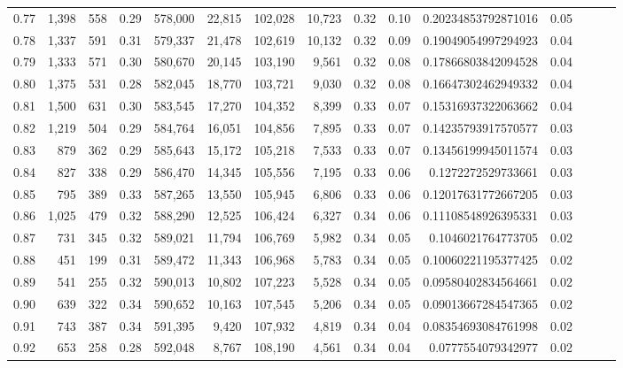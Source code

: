 \begin{tabular}{rrrrrrrrrrrrrrr}
0.77 &   1,398 &    558 &  0.29 &  578,000 &   22,815 &  102,028 &   10,723 &  0.32 &  0.10 &   0.20234853792871016 &      0.05 \\
0.78 &   1,337 &    591 &  0.31 &  579,337 &   21,478 &  102,619 &   10,132 &  0.32 &  0.09 &   0.19049054997294923 &      0.04 \\
0.79 &   1,333 &    571 &  0.30 &  580,670 &   20,145 &  103,190 &    9,561 &  0.32 &  0.08 &   0.17866803842094528 &      0.04 \\
0.80 &   1,375 &    531 &  0.28 &  582,045 &   18,770 &  103,721 &    9,030 &  0.32 &  0.08 &   0.16647302462949332 &      0.04 \\
0.81 &   1,500 &    631 &  0.30 &  583,545 &   17,270 &  104,352 &    8,399 &  0.33 &  0.07 &   0.15316937322063662 &      0.04 \\
0.82 &   1,219 &    504 &  0.29 &  584,764 &   16,051 &  104,856 &    7,895 &  0.33 &  0.07 &   0.14235793917570577 &      0.03 \\
0.83 &     879 &    362 &  0.29 &  585,643 &   15,172 &  105,218 &    7,533 &  0.33 &  0.07 &   0.13456199945011574 &      0.03 \\
0.84 &     827 &    338 &  0.29 &  586,470 &   14,345 &  105,556 &    7,195 &  0.33 &  0.06 &    0.1272272529733661 &      0.03 \\
0.85 &     795 &    389 &  0.33 &  587,265 &   13,550 &  105,945 &    6,806 &  0.33 &  0.06 &   0.12017631772667205 &      0.03 \\
0.86 &   1,025 &    479 &  0.32 &  588,290 &   12,525 &  106,424 &    6,327 &  0.34 &  0.06 &   0.11108548926395331 &      0.03 \\
0.87 &     731 &    345 &  0.32 &  589,021 &   11,794 &  106,769 &    5,982 &  0.34 &  0.05 &    0.1046021764773705 &      0.02 \\
0.88 &     451 &    199 &  0.31 &  589,472 &   11,343 &  106,968 &    5,783 &  0.34 &  0.05 &   0.10060221195377425 &      0.02 \\
0.89 &     541 &    255 &  0.32 &  590,013 &   10,802 &  107,223 &    5,528 &  0.34 &  0.05 &   0.09580402834564661 &      0.02 \\
0.90 &     639 &    322 &  0.34 &  590,652 &   10,163 &  107,545 &    5,206 &  0.34 &  0.05 &   0.09013667284547365 &      0.02 \\
0.91 &     743 &    387 &  0.34 &  591,395 &    9,420 &  107,932 &    4,819 &  0.34 &  0.04 &   0.08354693084761998 &      0.02 \\
0.92 &     653 &    258 &  0.28 &  592,048 &    8,767 &  108,190 &    4,561 &  0.34 &  0.04 &    0.0777554079342977 &      0.02 \\

\end{tabular}
